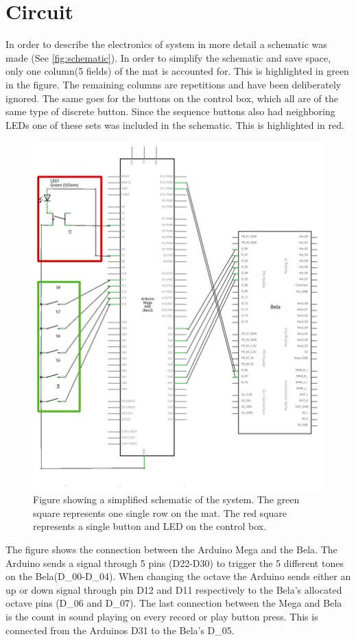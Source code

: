 \section{Circuit}
In order to describe the electronics of system in more detail a schematic was made (See \autoref{fig:schematic}).
In order to simplify the schematic and save space, only one column(5 fields) of the mat is accounted for. This is highlighted in green in the figure. The remaining columns are repetitions and have been deliberately ignored. The same goes for the buttons on the control box, which all are of the same type of discrete button. Since the sequence buttons also had neighboring LEDs one of these sets was included in the schematic. This is highlighted in red.

	\begin{figure}[H]
	\centering
	\includegraphics[width=1\linewidth]{figure/Implementation/project_schem_marked.png}
	\caption{Figure showing a simplified schematic of the system. The green square represents one single row on the mat. The red square represents a single button and LED on the control box.}
	\label{fig:schematic}
\end{figure}

The figure shows the connection between the Arduino Mega and the Bela. The Arduino sends a signal through 5 pins (D22-D30) to trigger the 5 different tones on the Bela(D\_00-D\_04). When changing the octave the Arduino sends either an up or down signal through pin D12 and D11 respectively to the Bela's allocated octave pins (D\_06 and D\_07). The last connection between the Mega and Bela is the count in sound playing on every record or play button press. This is connected from the Arduinos D31 to the Bela's D\_05.